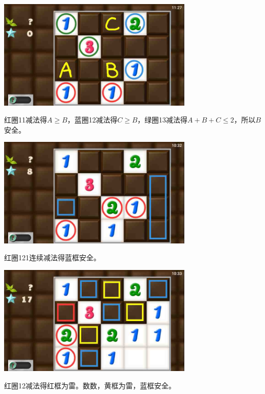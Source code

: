 \subsection{} %
\begin{center}
    \includegraphics[width=0.7\textwidth]{puzzlelow/179-1.jpg}
\end{center}
红圈11减法得$A\ge B$，蓝圈12减法得$C\ge B$，绿圈13减法得$A+B+C\le 2$，所以$B$安全。
\begin{center}
    \includegraphics[width=0.7\textwidth]{puzzlelow/179-2.jpg}
\end{center}
红圈121连续减法得蓝框安全。
\begin{center}
    \includegraphics[width=0.7\textwidth]{puzzlelow/179-3.jpg}
\end{center}
红圈12减法得红框为雷。数数，黄框为雷，蓝框安全。

